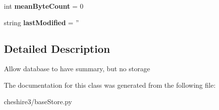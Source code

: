 \begin{DoxyCompactItemize}
\item 
\hypertarget{classcheshire3_1_1base_store_1_1_summary_object_a7f965c321def5083fb3a849226bcd16d}{int {\bfseries mean\-Byte\-Count} = 0}\label{classcheshire3_1_1base_store_1_1_summary_object_a7f965c321def5083fb3a849226bcd16d}

\item 
\hypertarget{classcheshire3_1_1base_store_1_1_summary_object_a5f33b7ac37cf35b04d4917638ba1444d}{string {\bfseries last\-Modified} = ''}\label{classcheshire3_1_1base_store_1_1_summary_object_a5f33b7ac37cf35b04d4917638ba1444d}

\end{DoxyCompactItemize}


\subsection{Detailed Description}
\begin{DoxyVerb}Allow database to have summary, but no storage \end{DoxyVerb}
 

The documentation for this class was generated from the following file\-:\begin{DoxyCompactItemize}
\item 
cheshire3/base\-Store.\-py\end{DoxyCompactItemize}
